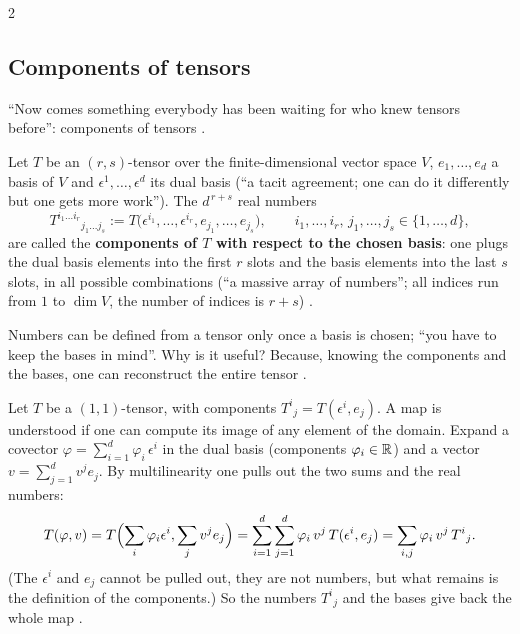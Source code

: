 \begin{paracol}{2}
\subsection{Components of tensors}

``Now comes something everybody has been waiting for who knew tensors before'': components of tensors .

\begin{definition}\label{def:c03-comp-tensor}
Let $T$ be an $(r,s)$-tensor over the finite-dimensional vector space $V$, $e_1,\dots,e_d$ a basis of $V$ and $\epsilon^1,\dots,\epsilon^d$ its dual basis (``a tacit agreement; one can do it differently but one gets more work''). The $d^{\,r+s}$ real numbers
\[
  T^{i_1\dots i_r}{}_{j_1\dots j_s}:=T\bigl(\epsilon^{i_1},\dots,\epsilon^{i_r},e_{j_1},\dots,e_{j_s}\bigr),\qquad i_1,\dots,i_r,\,j_1,\dots,j_s\in\{1,\dots,d\},
\]
are called the \textbf{components of $T$ with respect to the chosen basis}: one plugs the dual basis elements into the first $r$ slots and the basis elements into the last $s$ slots, in all possible combinations
(``a massive array of numbers''; all indices run from $1$ to $\dim V$, the number of indices is $r+s$) .
\end{definition}
Numbers can be defined from a tensor only once a basis is chosen; ``you have to keep the bases in mind''. Why is it useful? Because, knowing the components and the bases, one can reconstruct the entire tensor .

\begin{remark}\label{rem:c03-comp-tensor}
Let $T$ be a $(1,1)$-tensor, with components $T^i{}_j=T(\epsilon^i,e_j)$. A map is understood if one can compute its image of any element of the domain. Expand a covector $\varphi=\sum_{i=1}^d\varphi_i\,\epsilon^i$ in the dual basis (components $\varphi_i\in\mathbb{R}$) and a vector $v=\sum_{j=1}^dv^j e_j$.
By multilinearity one pulls out the two sums and the real numbers:
\[
  T(\varphi,v)=T\Bigl(\sum_i\varphi_i\epsilon^i,\sum_jv^je_j\Bigr)=\sum_{i=1}^d\sum_{j=1}^d\varphi_i\,v^j\,T(\epsilon^i,e_j)=\sum_{i,j}\varphi_i\,v^j\,T^i{}_j.
\]
(The $\epsilon^i$ and $e_j$ cannot be pulled out, they are not numbers, but what remains is the definition of the components.) So the numbers $T^i{}_j$ and the bases give back the whole map
.
\end{remark}


\end{paracol}
